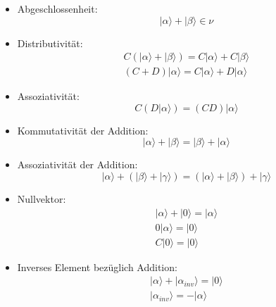 \documentclass[10pt,article,colorback,accentcolor=tud9d]{scrartcl}
\begin{document}
\begin{itemize}
\begin{itemize}
\item Abgeschlossenheit: 
\begin{equation} 
\left| \alpha \rangle \right.+\left|\beta\rangle \right. \in \nu
\end{equation}
\item Distributivität: 
\begin{equation}
\begin{aligned}
C(\left|\alpha\rangle \right. +\left|\beta\rangle \right.) = C\left|\alpha\rangle \right. +C\left|
\beta\rangle \right.\\
(C+D)\left|\alpha\rangle \right. = C\left|\alpha\rangle \right. +D\left|\alpha\rangle \right.
\end{aligned}
\end{equation}
\item Assoziativität: 
\begin{equation}
C(D\left|\alpha\rangle \right.)=(CD)\left|\alpha\rangle \right.
\end{equation}
\item Kommutativität der Addition: 
\begin{equation}
\left|\alpha\rangle \right. + \left|\beta\rangle \right. =\left|\beta\rangle \right. + \left|\alpha
\rangle \right.
\end{equation}
\item Assoziativität der Addition: 
\begin{equation}
\left|\alpha\rangle \right. + (\left|\beta\rangle \right. + \left|\gamma\rangle \right.) = (\left|
\alpha\rangle \right. + \left|\beta\rangle \right.)+\left|\gamma\rangle \right.
\end{equation}
\item Nullvektor: 
\begin{equation}
\begin{aligned}
\left|\alpha\rangle \right. +\left|0\rangle \right. = \left|\alpha\rangle \right.\\
0 \left|\alpha\rangle \right. = \left|0\rangle \right.\\
C \left|0\rangle \right. = \left|0\rangle \right.
\end{aligned}
\end{equation}
\item Inverses Element bezüglich Addition:
\begin{equation}
\begin{aligned}
\left|\alpha\rangle \right. + \left|{\alpha}_{inv}\rangle \right. = \left|0\rangle \right.\\
\left|{\alpha}_{inv}\rangle \right. = -\left|\alpha\rangle \right.
\end{aligned}
\end{equation}
\end{itemize}
 

\end{itemize}
\end{document}
